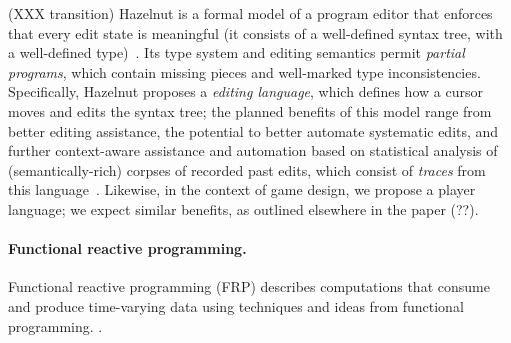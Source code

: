 (XXX transition)
Hazelnut is a formal model of a program editor that enforces that
every edit state is meaningful (it consists of a well-defined syntax
tree, with a well-defined type)~\cite{Omar17Hazelnut}.
%
Its type system and editing semantics permit \emph{partial programs},
which contain missing pieces and well-marked type inconsistencies.
%
Specifically, Hazelnut proposes a \emph{editing language}, which
defines how a cursor moves and edits the syntax tree; the planned
benefits of this model range from better editing assistance, the
potential to better automate systematic edits, and further
context-aware assistance and automation based on statistical analysis
of (semantically-rich) corpses of recorded past edits, which consist
of \emph{traces} from this language~\cite{Omar17Hazel}.
%
Likewise, in the context of game design, we propose a player language;
we expect similar benefits, as outlined elsewhere in the paper (??).

\paragraph{Functional reactive programming.}
%
Functional reactive programming (FRP) describes computations that
consume and produce time-varying data using techniques and ideas from
functional programming.
%
\citep{Fran,HudakEtAl,Cooper06embeddingdynamic,Krishnaswami11,Krishnaswami13,Czaplicki2013AFR}.


